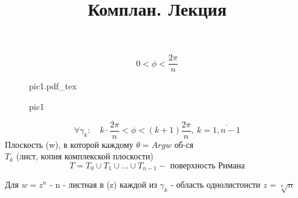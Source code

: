 \documentclass[a4paper]{article}
\newcommand{\incfig}[1]{%
\def\svgwidth{\columnwidth}
{#1.pdf_tex}
}
\begin{document}
\title{Комплан. Лекция}
\maketitle

\[
    0 < \phi < \frac{2\pi}{n} 
\]

\begin{figure}[ht]
    \centering
    \incfig{pic1}
    \caption{pic1}
    \label{fig:pic1}
\end{figure}

\[
    \forall \gamma_k: \quad k \cdot \frac{2\pi}{n} < \phi < (k+1)\frac{2\pi}{n} 
    , \ k = \overline{1, n-1}
\]
Плоскость (w), в которой каждому $ \theta = Arg w $ об-ся\\
$ T_k $ (лист, копия комплекской плоскости)\\
\[
    T = T_0 \cup T_1 \cup \dots \cup T_{n-1} - \text{ поверхность Римана}
\]

Для $ w = z^{n} $ - n - листная в (z) каждой из $ \gamma_k $ - область однолистонсти
$ z = \sqrt[n]{n}  $ 
\end{document}
